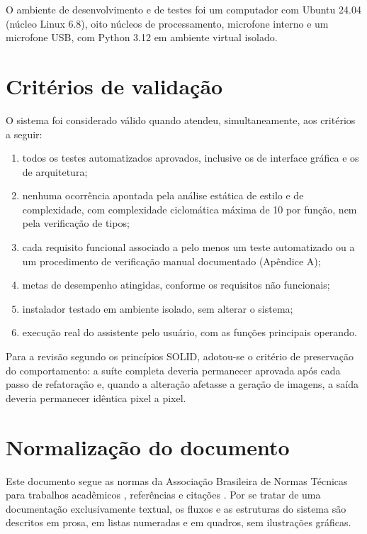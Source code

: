 O ambiente de desenvolvimento e de testes foi um computador com Ubuntu 24.04 (núcleo Linux 6.8),
oito núcleos de processamento, microfone interno e um microfone USB, com Python 3.12 em ambiente
virtual isolado.

\section{Critérios de validação}

O sistema foi considerado válido quando atendeu, simultaneamente, aos critérios a seguir:

\begin{enumerate}[label=\alph*)]
  \item todos os testes automatizados aprovados, inclusive os de interface gráfica e os de
        arquitetura;
  \item nenhuma ocorrência apontada pela análise estática de estilo e de complexidade, com
        complexidade ciclomática máxima de 10 por função, nem pela verificação de tipos;
  \item cada requisito funcional associado a pelo menos um teste automatizado ou a um procedimento de
        verificação manual documentado (Apêndice A);
  \item metas de desempenho atingidas, conforme os requisitos não funcionais;
  \item instalador testado em ambiente isolado, sem alterar o sistema;
  \item execução real do assistente pelo usuário, com as funções principais operando.
\end{enumerate}

Para a revisão segundo os princípios SOLID, adotou-se o critério de preservação do comportamento: a
suíte completa deveria permanecer aprovada após cada passo de refatoração e, quando a alteração
afetasse a geração de imagens, a saída deveria permanecer idêntica pixel a pixel.

\section{Normalização do documento}

Este documento segue as normas da Associação Brasileira de Normas Técnicas para trabalhos acadêmicos
\cite{abnt14724}, referências \cite{abnt6023} e citações \cite{abnt10520}. Por se tratar de uma
documentação exclusivamente textual, os fluxos e as estruturas do sistema são descritos em prosa, em
listas numeradas e em quadros, sem ilustrações gráficas.
